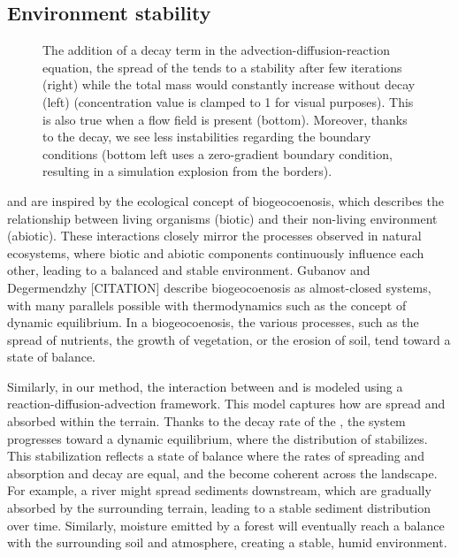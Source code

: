 \subsection{Environment stability}
\begin{figure}[H]
    \centering
    \caption{The addition of a decay term in the advection-diffusion-reaction equation, the spread of the  tends to a stability after few iterations (right) while the total mass would constantly increase without decay (left) (concentration value is clamped to 1 for visual purposes). This is also true when a flow field is present (bottom). Moreover, thanks to the decay, we see less instabilities regarding the boundary conditions (bottom left uses a zero-gradient boundary condition, resulting in a simulation explosion from the borders). }
    \label{fig:env-obj_stability-examples}
\end{figure}

 and  are inspired by the ecological concept of biogeocoenosis, which describes the relationship between living organisms (biotic) and their non-living environment (abiotic). These interactions closely mirror the processes observed in natural ecosystems, where biotic and abiotic components continuously influence each other, leading to a balanced and stable environment. Gubanov and Degermendzhy [CITATION] describe biogeocoenosis as almost-closed systems, with many parallels possible with thermodynamics such as the concept of dynamic equilibrium. In a biogeocoenosis, the various processes, such as the spread of nutrients, the growth of vegetation, or the erosion of soil, tend toward a state of balance. 

Similarly, in our method, the interaction between  and  is modeled using a reaction-diffusion-advection framework. This model captures how  are spread and absorbed within the terrain. Thanks to the decay rate of the , the system progresses toward a dynamic equilibrium, where the distribution of  stabilizes. This stabilization reflects a state of balance where the rates of spreading and absorption and decay are equal, and the  become coherent across the landscape. For example, a river might spread sediments downstream, which are gradually absorbed by the surrounding terrain, leading to a stable sediment distribution over time. Similarly, moisture emitted by a forest will eventually reach a balance with the surrounding soil and atmosphere, creating a stable, humid environment.

